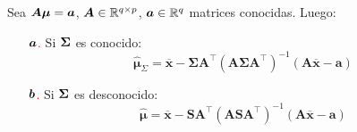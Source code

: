 Sea $\bf{A\mu} = \bf{a}$, $\bf{A} \in \R{q\times p}$, $\bf{a} \in \R{q}$ matrices conocidas. Luego: 
\begin{itemize}
\item[\textcolor{red}{$\bf{a}$.}] Si $\bf{\Sigma}$ es conocido:
$$
\widehat{\boldsymbol{\mu}}_{\Sigma}=\overline{\boldsymbol{x}}-\boldsymbol{\Sigma} \boldsymbol{A}^{\top}\left(\boldsymbol{A} \boldsymbol{\Sigma} \boldsymbol{A}^{\top}\right)^{-1}(\boldsymbol{A} \overline{\boldsymbol{x}}-\boldsymbol{a})
$$
\item[\textcolor{red}{$\bf{b}$.}] Si $\bf{\Sigma}$ es desconocido:
$$
\widehat{\boldsymbol{\mu}}=\overline{\boldsymbol{x}}-\boldsymbol{S A}^{\top}\left(\boldsymbol{A S A}^{\top}\right)^{-1}(\boldsymbol{A} \overline{\boldsymbol{x}}-\boldsymbol{a})
$$
\end{itemize}